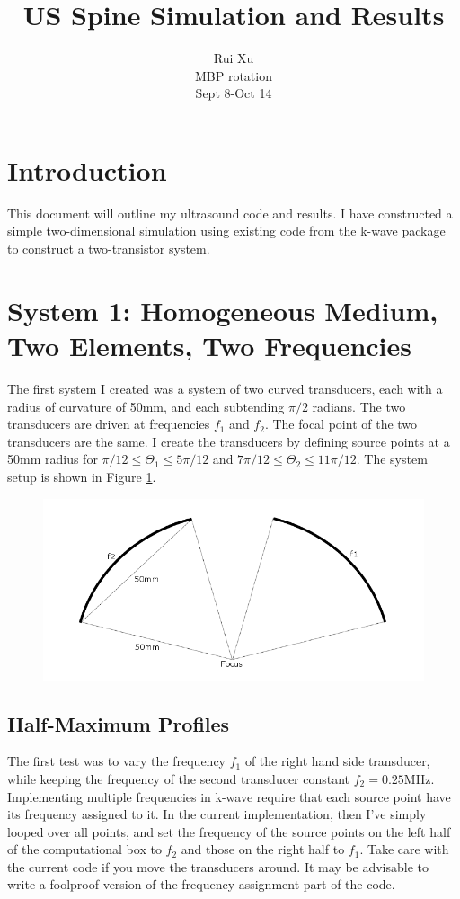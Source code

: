 \documentclass[10pt,a4paper]{article}
\title{US Spine Simulation and Results}
\author{Rui Xu \\ MBP rotation\\ Sept 8-Oct 14}
\begin{document}
\maketitle
\newpage

\section{Introduction}

This document will outline my ultrasound code and results. I have constructed a simple two-dimensional simulation using existing code from the k-wave package to construct a two-transistor system.

\section{System 1: Homogeneous Medium, Two Elements, Two Frequencies}

The first system I created was a system of two curved transducers, each with a radius of curvature of 50mm, and each subtending $\pi/2$ radians. The two transducers are driven at frequencies $f_1$ and $f_2$. The focal point of the two transducers are the same. I create the transducers by defining source points at a 50mm radius for $\pi/12 \leq \Theta_1 \leq 5\pi/12$ and $7\pi/12 \leq \Theta_2 \leq 11 \pi/12$. The system setup is shown in Figure \ref{setup1}.

\begin{figure}[!h]\label{setup1}
\centering
\includegraphics[scale=0.5]{setup1.png}
\centering
\end{figure}

\subsection{Half-Maximum Profiles}

The first test was to vary the frequency $f_1$ of the right hand side transducer, while keeping the frequency of the second transducer constant $f_2 = 0.25$MHz. Implementing multiple frequencies in k-wave require that each source point have its frequency assigned to it. In the current implementation, then I've simply looped over all points, and set the frequency of the source points on the left half of the computational box to $f_2$ and those on the right half to $f_1$. Take care with the current code if you move the transducers around. It may be advisable to write a foolproof version of the frequency assignment part of the code.\\
\end{document}
